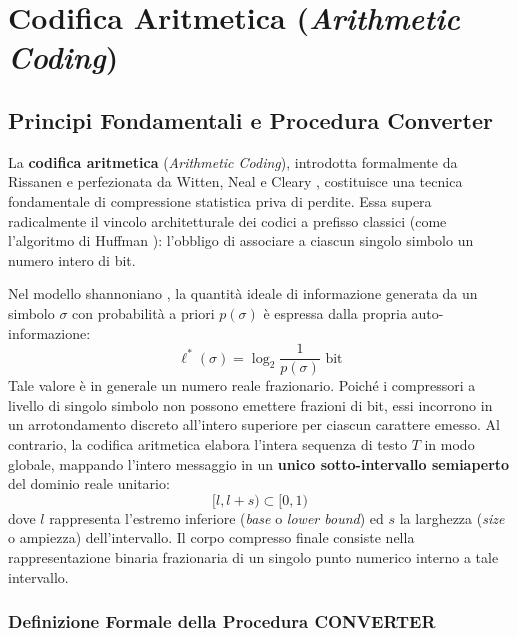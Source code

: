 \chapter{Codifica Aritmetica (\textit{Arithmetic Coding})}
\label{ch:codifica-aritmetica}

\section{Principi Fondamentali e Procedura Converter}
\label{sec:principi-fondamentali-converter}

La \textbf{codifica aritmetica} (\textit{Arithmetic Coding}), introdotta formalmente da Rissanen \cite{rissanen1976} e perfezionata da Witten, Neal e Cleary \cite{witten1987}, costituisce una tecnica fondamentale di compressione statistica priva di perdite. Essa supera radicalmente il vincolo architetturale dei codici a prefisso classici (come l'algoritmo di Huffman \cite{huffman1952}): l'obbligo di associare a ciascun singolo simbolo un numero intero di bit.

Nel modello shannoniano \cite{shannon1948}, la quantit\`a ideale di informazione generata da un simbolo $\sigma$ con probabilit\`a a priori $p(\sigma)$ \`e espressa dalla propria auto-informazione:
\begin{equation}
  \ell^*(\sigma) = \log_2 \frac{1}{p(\sigma)} \text{ bit}
\end{equation}
Tale valore \`e in generale un numero reale frazionario. Poich\'e i compressori a livello di singolo simbolo non possono emettere frazioni di bit, essi incorrono in un arrotondamento discreto all'intero superiore per ciascun carattere emesso. Al contrario, la codifica aritmetica elabora l'intera sequenza di testo $T$ in modo globale, mappando l'intero messaggio in un \textbf{unico sotto-intervallo semiaperto} del dominio reale unitario:
\begin{equation}
  [l, l + s) \subset [0, 1)
\end{equation}
dove $l$ rappresenta l'estremo inferiore (\textit{base} o \textit{lower bound}) ed $s$ la larghezza (\textit{size} o ampiezza) dell'intervallo. Il corpo compresso finale consiste nella rappresentazione binaria frazionaria di un singolo punto numerico interno a tale intervallo.

\FloatBarrier
\subsection{Definizione Formale della Procedura CONVERTER}
\label{subsec:definizione-converter}

